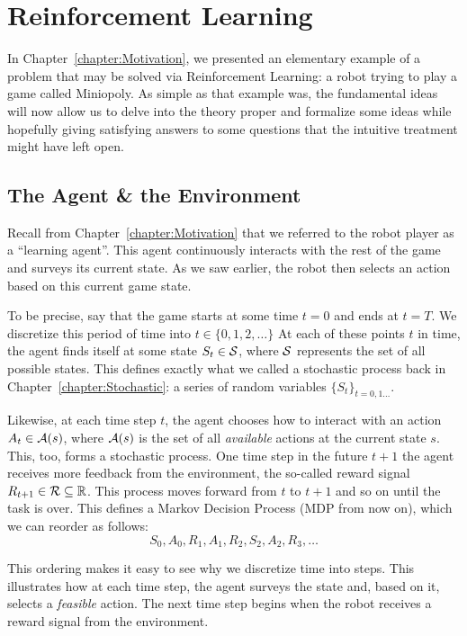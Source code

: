 \chapter{Reinforcement Learning}
\label{chapter:ReinforcementLearning}

In Chapter~\ref{chapter:Motivation}, we presented an elementary example of a
problem that may be solved via Reinforcement Learning: a robot trying to play a
game called Miniopoly. As simple as that example was, the fundamental ideas will
now allow us to delve into the theory proper and formalize some ideas while
hopefully giving satisfying answers to some questions that the intuitive
treatment might have left open.

\section{The Agent \& the Environment} Recall from
Chapter~\ref{chapter:Motivation} that we referred to the robot player as a
``learning agent''. This agent continuously interacts with the rest of the
game and surveys its current state. As we saw earlier, the robot then selects
an action based on this current game state.

To be precise, say that the game starts at some time $t=0$ and ends at $t=T$. We
discretize this period of time into $t \in \{0, 1, 2, \ldots \}$ At each of
these points $t$ in time, the agent finds itself at some state $S_t \in
\mathcal{S}$, where $\mathcal{S}$ represents the set of all possible states. This
defines exactly what we called a stochastic process back in 
Chapter~\ref{chapter:Stochastic}: a series of random variables $\{ S_t \}_{t =
0, 1 \ldots}$. 

Likewise, at each time step $t$, the agent chooses how to interact with an action
$A_t \in \mathcal{A}(s)$, where $\mathcal{A}(s)$ is the set of all \textit{available}
actions at the current state $s$. This, too, forms a stochastic process. One time
step in the future $t+1$ the agent receives more feedback from the environment,
the so-called reward signal $R_{t+1} \in \mathcal{R} \subseteq \mathbb{R}$. This process
moves forward from $t$ to $t+1$ and so on until the task is over. This defines a
Markov Decision Process (MDP from now on), which we can reorder as follows:
\begin{equation} S_0, A_0, R_1, A_1, R_2, S_2, A_2, R_3, \ldots \end{equation}

This ordering makes it easy to see why we discretize time
into steps. This illustrates how at each time step, the agent surveys the state
and, based on it, selects a \textit{feasible} action. The next time step begins
when the robot receives a reward signal from the environment. 

